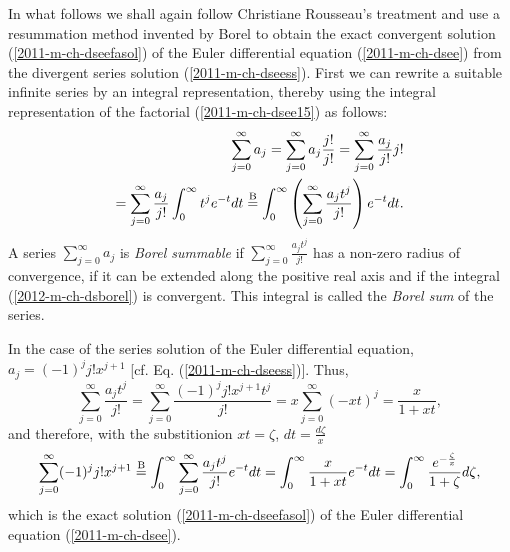 In what follows we shall again follow Christiane Rousseau's treatment \cite{rousseau-2004}
and use a resummation method
invented by Borel \cite{Borel1899}
to obtain the exact convergent solution
(\ref{2011-m-ch-dseefasol})
of the Euler differential equation  (\ref{2011-m-ch-dsee})
from the divergent series solution (\ref{2011-m-ch-dseess}).
First we can rewrite a suitable infinite series by an integral representation,
thereby using the integral representation of the factorial (\ref{2011-m-ch-dsee15})
as follows:
\begin{equation}
\begin{split}
\sum_{j=0}^\infty
a_j
=
\sum_{j=0}^\infty
a_j  \frac{j!}{j!}
=
\sum_{j=0}^\infty
  \frac{a_j}{j!}  j!
\\
=
\sum_{j=0}^\infty
  \frac{a_j}{j!}  \int_0^\infty t^j e^{-t} dt
\stackrel{{\rm B}}{=}
\int_0^\infty \left(\sum_{j=0}^\infty   \frac{a_j t^j}{j!}\right)   e^{-t} dt
.
\end{split}
\label{2012-m-ch-dsborel}
\end{equation}
A series  $\sum_{j=0}^\infty   a_j $
is {\em Borel summable}
if $\sum_{j=0}^\infty   \frac{a_j t^j}{j!}$ has a non-zero radius of convergence,
if it can be extended along the positive real axis and if the integral
(\ref{2012-m-ch-dsborel}) is convergent.
This integral is called the
{\em Borel sum}
of the series.

In the case of the series solution of the Euler differential equation, $a_j = (-1)^j j! x^{j+1}$
[cf. Eq. (\ref{2011-m-ch-dseess})].
Thus,
\begin{equation}
 \sum_{j=0}^\infty   \frac{a_j t^j}{j!}
=
 \sum_{j=0}^\infty   \frac{(-1)^j j! x^{j+1} t^j}{j!}
=
 x\sum_{j=0}^\infty   (-xt)^j =\frac{x}{1+xt},
\label{2012-m-ch-dsborelee}
\end{equation}
and therefore, with the substitionion $xt=\zeta$, $dt= \frac{d\zeta}{x}$
\begin{equation}
 \sum_{j=0}^\infty  (-1)^j j! x^{j+1}
\stackrel{{\rm B}}{=}
\int_0^\infty \sum_{j=0}^\infty   \frac{a_j t^j}{j!}   e^{-t} dt
 =
\int_0^\infty \frac{x}{1+xt}   e^{-t} dt
 =
\int_0^\infty \frac{e^{-\frac{\zeta}{x}}}{1+\zeta}    d\zeta,
\label{2012-m-ch-dsborelee1}
\end{equation}
which is the exact solution (\ref{2011-m-ch-dseefasol})
of the Euler differential equation  (\ref{2011-m-ch-dsee}).

